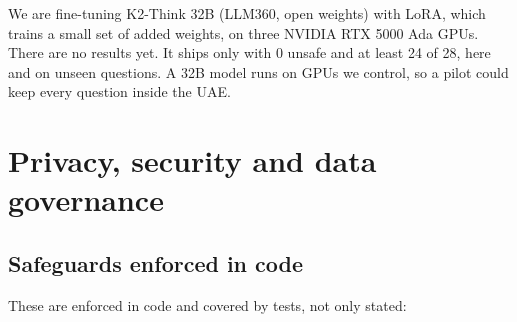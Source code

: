 \documentclass[10.5pt,a4paper]{article}
\newcommand{\chapterbreak}{}
\let\oldsection\section
\renewcommand{\section}{\chapterbreak\oldsection}
\begin{document}
We are fine-tuning K2-Think 32B (LLM360, open weights) with LoRA, which trains a small set of added weights, on three
NVIDIA RTX 5000 Ada GPUs. There are no results yet. It ships only with 0 unsafe and at least 24 of 28, here and on
unseen questions. A 32B model runs on GPUs we control, so a pilot could keep every question inside the UAE.

\section{Privacy, security and data governance}

\subsection{Safeguards enforced in code}

These are enforced in code and covered by tests, not only stated:
\end{document}
